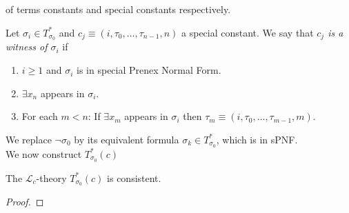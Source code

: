of terms constants and special constants respectively.
\begin{definition}
    Let $\sigma_i\in T^\ast_{\sigma_0}$ and $c_j\equiv (i,\tau_0,\dots,\tau_{n-1},n)$ a special constant. We say that \emph{$c_j$ is a witness of $\sigma_i$} if 
    \begin{enumerate}
        \item $i\geq 1$ and $\sigma_i$ is in special Prenex Normal Form.
        \item $\exists x_n$ appears in $\sigma_i$.
        \item For each $m<n$: If $\exists x_m$ appears in $\sigma_i$ then $\tau_m \equiv (i,\tau_0,\dots,\tau_{m-1},m)$.  
    \end{enumerate}
\end{definition} 
We replace $\neg\sigma_0$ by its equivalent formula $\sigma_k\in T^\ast_{\sigma_0}$, which is in sPNF.\\
We now construct $T^\ast_{\sigma_0}(c)$
\begin{lemma}
    The $\mathcal{L}_c$-theory $T^\ast_{\sigma_0}(c)$ is consistent.
\end{lemma}
\begin{proof}
    
\end{proof}
